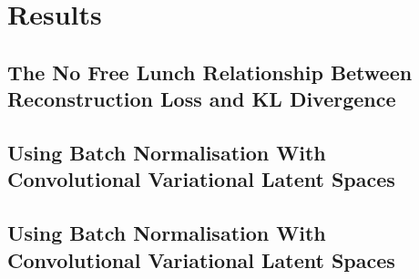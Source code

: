 \chapter{Results}

\label{ch:Results}

\section{The No Free Lunch Relationship Between Reconstruction Loss and KL Divergence}

\section{Using Batch Normalisation With Convolutional Variational Latent Spaces}

\section{Using Batch Normalisation With Convolutional Variational Latent Spaces}

\lipsum[1-2]